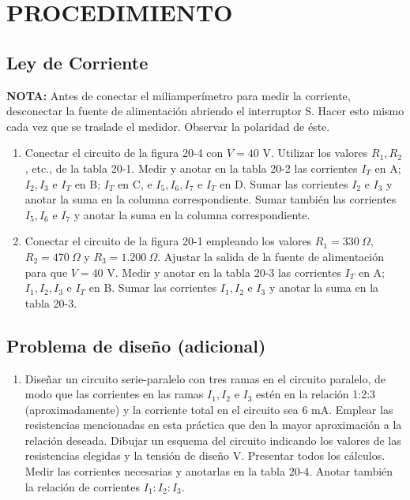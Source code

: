 \documentclass[12pt, a4paper]{article}
\begin{document}
\vspace{1cm}

\section*{PROCEDIMIENTO}
    \subsection*{Ley de Corriente}
    \textbf{NOTA:} Antes de conectar el miliamperímetro para medir la corriente, desconectar la fuente de alimentación abriendo el interruptor S. Hacer esto mismo cada vez que se traslade el medidor. Observar la polaridad de éste.
    
    \begin{enumerate}[label=\arabic*.]
        \item Conectar el circuito de la figura 20-4 con $V=40$ V. Utilizar los valores $R_1, R_2$, etc., de la tabla 20-1. Medir y anotar en la tabla 20-2 las corrientes $I_T$ en A; $I_2, I_3$ e $I_T$ en B; $I_T$ en C, e $I_5, I_6, I_7$ e $I_T$ en D. Sumar las corrientes $I_2$ e $I_3$ y anotar la suma en la columna correspondiente. Sumar también las corrientes $I_5, I_6$ e $I_7$ y anotar la suma en la columna correspondiente.
        \item Conectar el circuito de la figura 20-1 empleando los valores $R_1 = 330~\Omega$, $R_2 = 470~\Omega$ y $R_3 = 1.200~\Omega$. Ajustar la salida de la fuente de alimentación para que $V=40$ V. Medir y anotar en la tabla 20-3 las corrientes $I_T$ en A; $I_1, I_2, I_3$ e $I_T$ en B. Sumar las corrientes $I_1, I_2$ e $I_3$ y anotar la suma en la tabla 20-3.
    \end{enumerate}

    \subsection*{Problema de diseño (adicional)}
    \begin{enumerate}[label=\arabic*., start=3]
        \item Diseñar un circuito serie-paralelo con tres ramas en el circuito paralelo, de modo que las corrientes en las ramas $I_1, I_2$ e $I_3$ estén en la relación 1:2:3 (aproximadamente) y la corriente total en el circuito sea 6 mA. Emplear las resistencias mencionadas en esta práctica que den la mayor aproximación a la relación deseada. Dibujar un esquema del circuito indicando los valores de las resistencias elegidas y la tensión de diseño V. Presentar todos los cálculos. Medir las corrientes necesarias y anotarlas en la tabla 20-4. Anotar también la relación de corrientes $I_1:I_2:I_3$.
    \end{enumerate}
    
\end{document}
